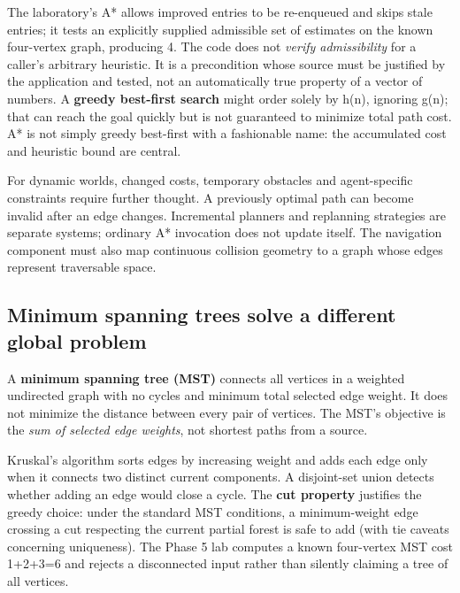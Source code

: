 The laboratory's A* allows improved entries to be re-enqueued and skips stale entries; it tests an explicitly supplied admissible set of estimates on the known four-vertex graph, producing 4. The code does not \emph{verify admissibility} for a caller's arbitrary heuristic. It is a precondition whose source must be justified by the application and tested, not an automatically true property of a vector of numbers. A \textbf{greedy best-first search} might order solely by h(n), ignoring g(n); that can reach the goal quickly but is not guaranteed to minimize total path cost. A* is not simply greedy best-first with a fashionable name: the accumulated cost and heuristic bound are central.

For dynamic worlds, changed costs, temporary obstacles and agent-specific constraints require further thought. A previously optimal path can become invalid after an edge changes. Incremental planners and replanning strategies are separate systems; ordinary A* invocation does not update itself. The navigation component must also map continuous collision geometry to a graph whose edges represent traversable space.

\subsection{Minimum spanning trees solve a different global problem}\label{01-foundations-i-ch008-minimum-spanning-trees-solve-a-different-global-problem}

\hypertarget{01-foundations-i-ch008-minimum-spanning-trees-solve-a-different-global-problem}{}

A \textbf{minimum spanning tree (MST)} connects all vertices in a weighted undirected graph with no cycles and minimum total selected edge weight. It does not minimize the distance between every pair of vertices. The MST's objective is the \emph{sum of selected edge weights}, not shortest paths from a source.

Kruskal's algorithm sorts edges by increasing weight and adds each edge only when it connects two distinct current components. A disjoint-set union detects whether adding an edge would close a cycle. The \textbf{cut property} justifies the greedy choice: under the standard MST conditions, a minimum-weight edge crossing a cut respecting the current partial forest is safe to add (with tie caveats concerning uniqueness). The Phase 5 lab computes a known four-vertex MST cost 1+2+3=6 and rejects a disconnected input rather than silently claiming a tree of all vertices.

